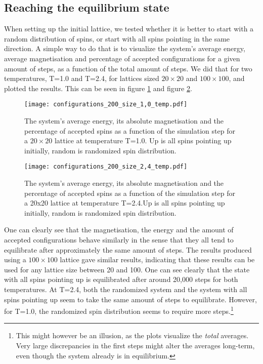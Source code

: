 \documentclass[10pt,a4paper]{article}
\begin{document}
\subsection{Reaching the equilibrium state}
When setting up the initial lattice, we tested whether it is better to start with a random distribution of spins, or start with all spins pointing in the same direction. A simple way to do that is to visualize the system's average energy, average magnetisation and percentage of accepted configurations for a given amount of steps, as a function of the total amount of steps. We did that for two temperatures, T=1.0 and T=2.4, for lattices sized $20\times20$ and $100\times 100$, and plotted the results. This can be seen in figure \ref{Average energy, average absolute magnetisation and accepted spins at T1.0} and figure \ref{Average energy, average absolute magnetisation and accepted spins at T2.4}.
\begin{figure}[H]
    \texttt{[image: configurations\_200\_size\_1,0\_temp.pdf]}
\caption[Average energy, average absolute magnetisation \& accepted spins at T=1.0]{The system's average energy, its absolute magnetisation and the percentage of accepted spins as a function of the simulation step for a $20\times20$ lattice at temperature T=1.0. Up is all spins pointing up initially, random is randomized spin distribution.}\label{Average energy, average absolute magnetisation and accepted spins at T1.0}
\end{figure}
\begin{figure}[H]
\texttt{[image: configurations\_200\_size\_2,4\_temp.pdf]}
\caption[Average energy, average absolute magnetisation \& accepted spins at T=2.4]{The system's average energy, its absolute magnetisation and the percentage of accepted spins as a function of the simulation step for a 20x20 lattice at temperature T=2.4.Up is all spins pointing up initially, random is randomized spin distribution.}\label{Average energy, average absolute magnetisation and accepted spins at T2.4}
\end{figure}
One can clearly see that the magnetisation, the energy and the amount of accepted configurations behave similarly in the sense that they all tend to equilibrate after approximately the same amount of steps.
The results produced using a $100\times100$ lattice gave similar results, indicating that these results can be used for any lattice size between 20 and 100. One can see clearly that the state with all spins pointing up is equilibrated after around 20,000 steps for both temperatures. At T=2.4, both the randomized system and the system with all spins pointing up seem to take the same amount of steps to equilibrate. However, for T=1.0, the randomized spin distribution seems to require more steps.\footnote{This might however be an illusion, as the plots visualize the \textit{total} averages. Very large discrepancies in the first steps might alter the averages long-term, even though the system already is in equilibrium.}\\
\end{document}
